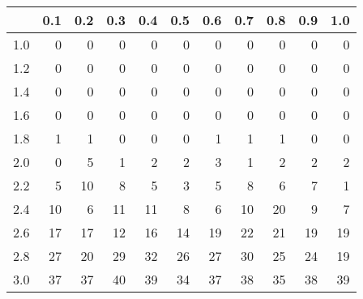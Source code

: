 \begin{tabular}{r|rrrrrrrrrr}
  & 0.1 & 0.2 & 0.3 & 0.4 & 0.5 & 0.6 & 0.7 & 0.8 & 0.9 & 1.0 \\ 
  \hline
1.0 & 0 & 0 & 0 & 0 & 0 & 0 & 0 & 0 & 0 & 0 \\ 
  1.2 & 0 & 0 & 0 & 0 & 0 & 0 & 0 & 0 & 0 & 0 \\ 
  1.4 & 0 & 0 & 0 & 0 & 0 & 0 & 0 & 0 & 0 & 0 \\ 
  1.6 & 0 & 0 & 0 & 0 & 0 & 0 & 0 & 0 & 0 & 0 \\ 
  1.8 & 1 & 1 & 0 & 0 & 0 & 1 & 1 & 1 & 0 & 0 \\ 
  2.0 & 0 & 5 & 1 & 2 & 2 & 3 & 1 & 2 & 2 & 2 \\ 
  2.2 & 5 & 10 & 8 & 5 & 3 & 5 & 8 & 6 & 7 & 1 \\ 
  2.4 & 10 & 6 & 11 & 11 & 8 & 6 & 10 & 20 & 9 & 7 \\ 
  2.6 & 17 & 17 & 12 & 16 & 14 & 19 & 22 & 21 & 19 & 19 \\ 
  2.8 & 27 & 20 & 29 & 32 & 26 & 27 & 30 & 25 & 24 & 19 \\ 
  3.0 & 37 & 37 & 40 & 39 & 34 & 37 & 38 & 35 & 38 & 39 \\ 
  \end{tabular}
